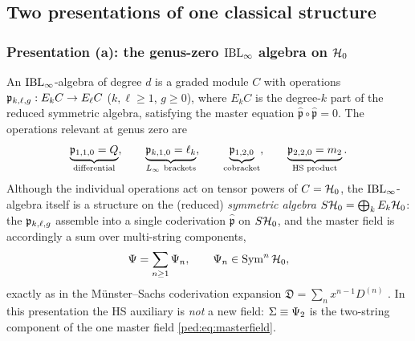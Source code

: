 \subsection{Two presentations of one classical structure}
\label{ped:sec:two}

\subsubsection{Presentation (a): the genus-zero \texorpdfstring{$\mathrm{IBL}_\infty$}{IBL} algebra on
\texorpdfstring{$\mathcal{H}_0$}{H}}
\label{ped:sec:two:ibl}

An $\mathrm{IBL}_\infty$-algebra of degree $d$ \cite{Cieliebak:2015:HomologicalAlgebraRelated} is a graded module $C$ with operations
$\mathfrak{p}_{k,\ell,g}:E_kC\to E_\ell C$ ($k,\ell\ge1$, $g\ge0$), where $E_kC$ is the degree-$k$ part of the
reduced symmetric algebra, satisfying the master equation $\hat{\mathfrak p}\circ
\hat{\mathfrak p}=0$. The operations relevant at genus zero are
\begin{equation}
	\underbrace{\mathfrak p_{1,1,0}=Q}_{\text{differential}},\qquad
	\underbrace{\mathfrak p_{k,1,0}=\ell_k}_{\Loo\ \text{brackets}},\qquad
	\underbrace{\mathfrak p_{1,2,0}}_{\text{cobracket}},\qquad
	\underbrace{\mathfrak p_{2,2,0}=\mtwo}_{\text{HS product}}.
	\label{ped:eq:ops}
\end{equation}
Although the individual operations act on tensor powers of $C=\mathcal{H}_0$, the $\mathrm{IBL}_\infty$-algebra
itself is a structure on the (reduced) \emph{symmetric algebra} $S\mathcal{H}_0=\bigoplus_k E_k
\mathcal{H}_0$: the $\mathfrak{p}_{k,\ell,g}$ assemble into a single coderivation $\hat{\mathfrak p}$ on
$S\mathcal{H}_0$, and the master field is accordingly a sum over multi-string components,
\begin{equation}
	\Psi=\sum_{n\ge1}\Psi_n,\qquad \Psi_n\in\operatorname{Sym}^n\mathcal{H}_0,
	\label{ped:eq:masterfield}
\end{equation}
exactly as in the Münster--Sachs coderivation expansion $\mathfrak D=\sum_n x^{n-1}D^{(n)}$
\cite[\S IV.B]{MunsterSachs2013}. In this presentation the HS auxiliary is \emph{not} a new
field: $\Sigma\equiv\Psi_2$ is the two-string component of the one master field
\eqref{ped:eq:masterfield}.

